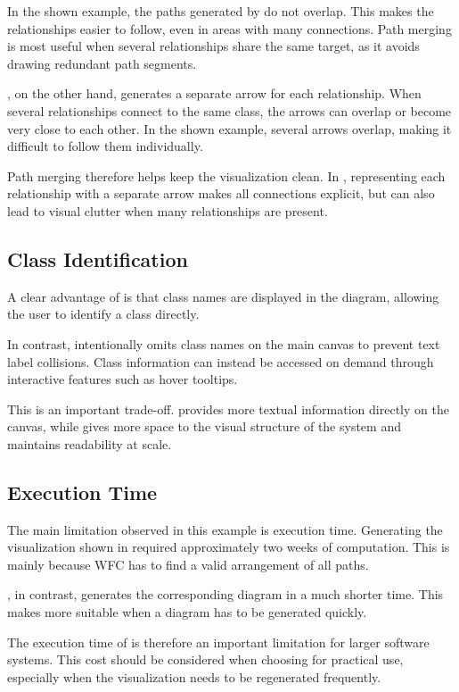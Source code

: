 \documentclass[../../main.tex]{subfiles}
\begin{document}
In the shown example, the paths generated by \wassis do not overlap. This makes the relationships easier to follow, even in areas with many connections. Path merging is most useful when several relationships share the same target, as it avoids drawing redundant path segments.

\plantuml, on the other hand, generates a separate arrow for each relationship. When several relationships connect to the same class, the arrows can overlap or become very close to each other. In the shown example, several arrows overlap, making it difficult to follow them individually.

Path merging therefore helps \wassis keep the visualization clean. In \plantuml, representing each relationship with a separate arrow makes all connections explicit, but can also lead to visual clutter when many relationships are present.

\subsection{Class Identification}

A clear advantage of \plantuml is that class names are displayed in the diagram, allowing the user to identify a class directly.

In contrast, \wassis intentionally omits class names on the main canvas to prevent text label collisions. Class information can instead be accessed on demand through interactive features such as hover tooltips.

This is an important trade-off. \plantuml provides more textual information directly on the canvas, while \wassis gives more space to the visual structure of the system and maintains readability at scale.

\subsection{Execution Time}

The main limitation observed in this example is execution time. Generating the \wassis visualization shown in  required approximately two weeks of computation. This is mainly because WFC has to find a valid arrangement of all paths.

\plantuml, in contrast, generates the corresponding diagram in a much shorter time. This makes \plantuml more suitable when a diagram has to be generated quickly.

The execution time of \wassis is therefore an important limitation for larger software systems. This cost should be considered when choosing \wassis for practical use, especially when the visualization needs to be regenerated frequently.
\end{document}
